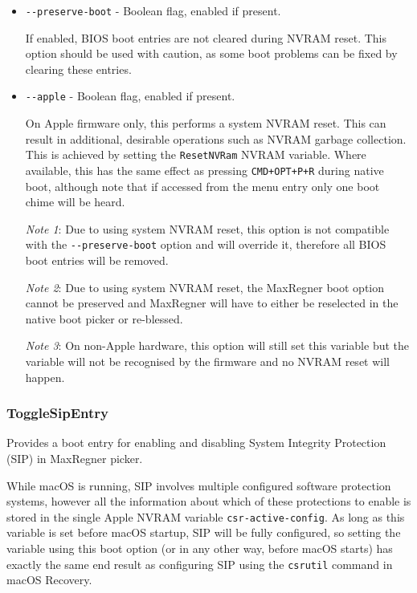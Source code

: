 \documentclass[]{article}
\begin{document}
\begin{itemize}
  \item \texttt{-{}-preserve-boot} - Boolean flag, enabled if present. \medskip

  If enabled, BIOS boot entries are not cleared during NVRAM reset. This option should
  be used with caution, as some boot problems can be fixed by clearing these entries. \medskip

  \item \texttt{-{}-apple} - Boolean flag, enabled if present. \medskip

  On Apple firmware only, this performs a system NVRAM reset. This can result in
  additional, desirable operations such as NVRAM garbage collection. This is achieved by
  setting the \texttt{ResetNVRam} NVRAM variable.
  Where available, this has the same effect as pressing \texttt{CMD+OPT+P+R} during native boot,
  although note that if accessed from the menu entry only one boot chime will be heard. \medskip

  \emph{Note 1}: Due to using system NVRAM reset, this option is not compatible with the \texttt{-{}-preserve-boot}
  option and will override it, therefore all BIOS boot entries will be removed. \medskip

  \emph{Note 2}: Due to using system NVRAM reset, the MaxRegner boot option
  cannot be preserved and MaxRegner will have to either be reselected in the native boot picker or
  re-blessed. \medskip

  \emph{Note 3}: On non-Apple hardware, this option will still set this variable but the
  variable will not be recognised by the firmware and no NVRAM reset will happen. \medskip
\end{itemize}

\subsubsection{ToggleSipEntry}\label{uefitogglesip}

Provides a boot entry for enabling and disabling System Integrity Protection (SIP) in MaxRegner picker.

While macOS is running, SIP involves multiple configured software protection systems, however
all the information about which of these protections to enable is stored in the single Apple NVRAM variable
\texttt{csr-active-config}. As long as this variable is set before macOS startup,
SIP will be fully configured, so setting the variable using this boot option
(or in any other way, before macOS starts) has exactly the same end result as configuring SIP using the
\texttt{csrutil} command in macOS Recovery.
\end{document}
